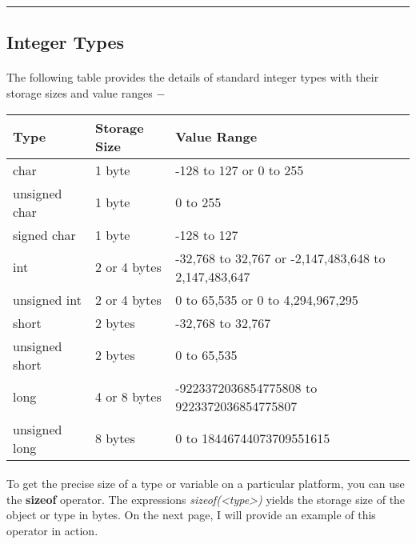 \rule{\textwidth}{0.3ex}\par

\subsection{Integer Types}
   \paragraph{}
      The following table provides the details of standard integer types with their storage sizes and value ranges −
      \begin{center}
         \begin{tabular}{ ||p{1in}| p{1in} | p{4in}|| }
            \hline
            \textbf{Type} & \textbf{Storage Size} & \textbf{Value Range} \\ [1.75ex]
            \hline\hline
            char & 1 byte & -128 to 127 or 0 to 255 \\
            \hline
            unsigned char & 1 byte & 0 to 255 \\
            \hline
            signed char & 1 byte & -128 to 127 \\
            \hline
            int & 2 or 4 bytes & -32,768 to 32,767 or -2,147,483,648 to 2,147,483,647 \\
            \hline
            unsigned int & 2 or 4 bytes & 0 to 65,535 or 0 to 4,294,967,295 \\
            \hline
            short & 2 bytes & -32,768 to 32,767 \\
            \hline
            unsigned short & 2 bytes & 0 to 65,535 \\
            \hline
            long & 4 or 8 bytes & -9223372036854775808 to 9223372036854775807 \\ [0.8ex]
            \hline
            unsigned long & 8 bytes & 0 to 18446744073709551615 \\
            \hline
         \end{tabular}
      \end{center}

\paragraph{}
   To get the precise size of a type or variable on a particular platform, you can use the \textbf{sizeof} operator.
   The expressions \textit{sizeof(<type>)} yields the storage size of the object or type in bytes. On the next page, I will provide an example of 
   this operator in action.

